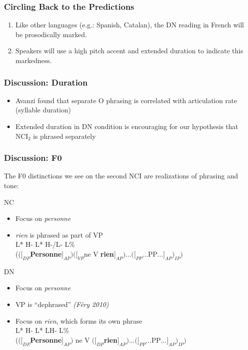 \documentclass{beamer}
\begin{document}
\begin{frame}
\frametitle{Circling Back to the Predictions}
\begin{enumerate}
\item Like other languages (e.g.: Spanish, Catalan), the DN reading in French will be prosodically marked.
\item Speakers will use a high pitch accent and extended duration to indicate this markedness.
\end{enumerate}
\end{frame}

\begin{frame}
\frametitle{Discussion: Duration}
\begin{itemize}
\item Avanzi found that separate O phrasing is correlated with articulation rate (syllable duration)
\item Extended duration in DN condition is encouraging for our hypothesis that NCI$_{2}$ is phrased separately
\end{itemize}
\end{frame}

\begin{frame}
\frametitle{Discussion: F0}
The F0 distinctions we see on the second NCI are realizations of phrasing and tone:
\begin{block}{NC}
\begin{itemize}
\item Focus on \textit{personne}
\item \textit{rien} is phrased as part of VP\\
L*\hspace{1.7cm} H-\hspace{.8cm} L* \hspace{.5cm}\alert{H-/L-} \hspace{1.2cm}L\%\\
\small{(($[_{DP}$\textbf{Personne}$]_{AP})([_{VP}$ne V \textbf{rien}$]_{AP})...([_{PP}...$PP$...]_{AP})_{IP})$}
\end{itemize}
\end{block}
\begin{block}{DN}
\begin{itemize}
\item Focus on \textit{personne}
\item VP is ``dephrased'' \textit{(F\'ery 2010)}
\item Focus on \textit{rien}, which forms its own phrase\\
L* \hspace{1.7cm}H-\hspace{.5cm} L* \hspace{.8cm}\alert{LH-} \hspace{1.6cm}L\%\\
\small{(($[_{DP}$\textbf{Personne}$]_{AP})$ ne V $([_{DP}$\textbf{rien}$]_{AP})...([_{PP}...$PP$...]_{AP})_{IP})$}
\end{itemize}
\end{block}
\end{frame}
\end{document}
